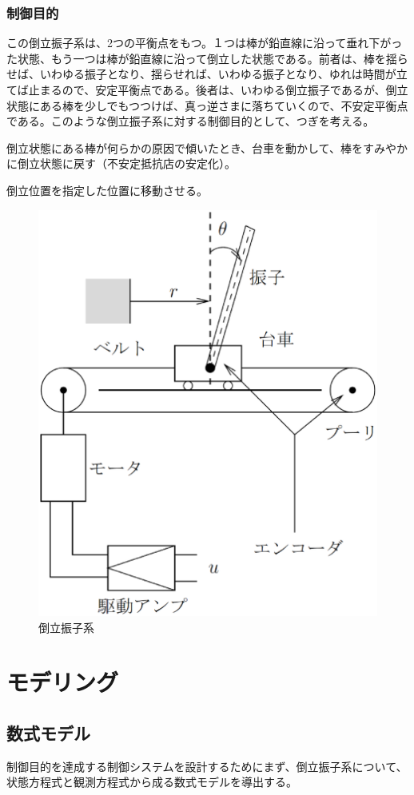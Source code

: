 \documentclass[a4j,11pt,twoside]{jbook}
\begin{document}
\subsection{制御目的}
この倒立振子系は、2つの平衡点をもつ。１つは棒が鉛直線に沿って垂れ下がった状態、もう一つは棒が鉛直線に沿って倒立した状態である。前者は、棒を揺らせば、いわゆる振子となり、揺らせれば、いわゆる振子となり、ゆれは時間が立てば止まるので、安定平衡点である。後者は、いわゆる倒立振子であるが、倒立状態にある棒を少しでもつつけば、真っ逆さまに落ちていくので、不安定平衡点である。このような倒立振子系に対する制御目的として、つぎを考える。
\begin{description}
	\setlength{\itemindent}{0pt}
	\item[1゜]倒立状態にある棒が何らかの原因で傾いたとき、台車を動かして、棒をすみやかに倒立状態に戻す（不安定抵抗店の安定化）。
	\item[2゜]倒立位置を指定した位置に移動させる。
\end{description}
\begin{figure}[htbp]
	\begin{center}
		\includegraphics[width = 0.6 \linewidth]{model.eps}
		\caption{倒立振子系}
		\label{fig:倒立振子系}
	\end{center}
\end{figure}

\chapter{モデリング}
\section{数式モデル}
制御目的を達成する制御システムを設計するためにまず、倒立振子系について、状態方程式と観測方程式から成る数式モデルを導出する。
\end{document}
